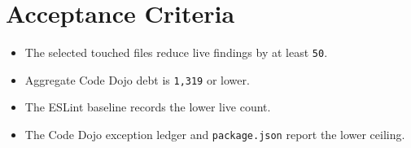 \section{Acceptance Criteria}\label{record-229-acceptance-criteria}

\begin{itemize}
\tightlist
\item
  The selected touched files reduce live findings by at least \texttt{5\allowbreak{}0}.
\item
  Aggregate Code Dojo debt is \texttt{1\allowbreak{},\allowbreak{}3\allowbreak{}1\allowbreak{}9} or lower.
\item
  The ESLint baseline records the lower live count.
\item
  The Code Dojo exception ledger and \texttt{p\allowbreak{}a\allowbreak{}c\allowbreak{}k\allowbreak{}a\allowbreak{}g\allowbreak{}e\allowbreak{}.\allowbreak{}j\allowbreak{}s\allowbreak{}o\allowbreak{}n} report the lower ceiling.
\end{itemize}

